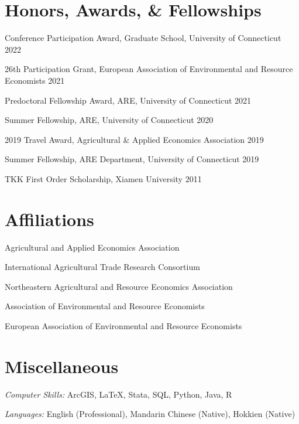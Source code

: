 \documentclass[10.5pt,letterpaper]{article}
\renewenvironment{itemize}{
	\begin{list}{}{
			\setlength{\leftmargin}{1.5em}
		}
	}{
	\end{list}
}
\begin{document}

\section*{\textbf{Honors, Awards, \& Fellowships}}
\begin{itemize}
	\item[-] Conference Participation Award, Graduate School, University of Connecticut \hfill 2022
	\item[-] 26th Participation Grant, European Association of Environmental and Resource Economists \hfill 2021
	\item[-] Predoctoral Fellowship Award, ARE, University of Connecticut \hfill 2021
	\item[-] Summer Fellowship, ARE, University of Connecticut \hfill 2020
	\item[-] 2019 Travel Award, Agricultural \& Applied Economics Association  \hfill 2019
	\item[-] Summer Fellowship, ARE Department, University of Connecticut \hfill 2019
	\item[-] TKK First Order Scholarship, Xiamen University \hfill 2011
\end{itemize}


	
	\section*{\textbf{Affiliations}}
	\begin{itemize}
		\item[-] Agricultural and Applied Economics Association
		\item[-] International Agricultural Trade Research Consortium
		\item[-] Northeastern Agricultural and Resource Economics Association
		\item[-] Association of Environmental and Resource Economists
		\item[-] European Association of Environmental and Resource Economists
	\end{itemize}
	
	\section*{\textbf{Miscellaneous}}
	\begin{itemize}
		\item[-] \textit{Computer Skills:} ArcGIS, \LaTeX, Stata, SQL, Python, Java, R
		\item[-] \textit{Languages:} English (Professional), Mandarin Chinese (Native), Hokkien (Native)
	\end{itemize}
	
\end{document}
